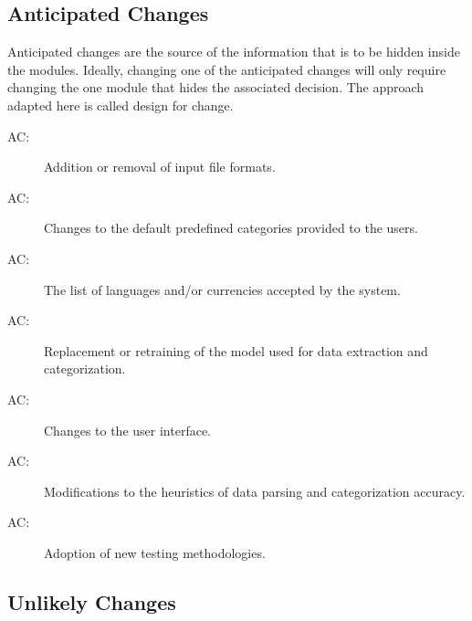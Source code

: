\documentclass[12pt, titlepage]{article}
\newcounter{acnum}
\newcommand{\actheacnum}{AC\theacnum}
\begin{document}
\subsection{Anticipated Changes} \label{SecAchange}

Anticipated changes are the source of the information that is to be hidden
inside the modules. Ideally, changing one of the anticipated changes will only
require changing the one module that hides the associated decision. The approach
adapted here is called design for
change.


\begin{description}
  \item[ \actheacnum \label{acInputs}:] Addition or removal of input file formats.
  \item[ \actheacnum \label{acCategories}:] Changes to the default predefined categories provided to the users.
  \item[ \actheacnum \label{acCurrencies}:] The list of languages and/or currencies accepted by the system.
  \item[ \actheacnum \label{acModel}:] Replacement or retraining of the model used for data extraction and categorization.
  \item[ \actheacnum \label{acInterface}:] Changes to the user interface.
  \item[ \actheacnum \label{acHeuristics}:] Modifications to the heuristics of data parsing and categorization accuracy.
  \item[ \actheacnum \label{acTesting}:] Adoption of new testing methodologies. 
\end{description}

\subsection{Unlikely Changes} \label{SecUchange}
\end{document}

